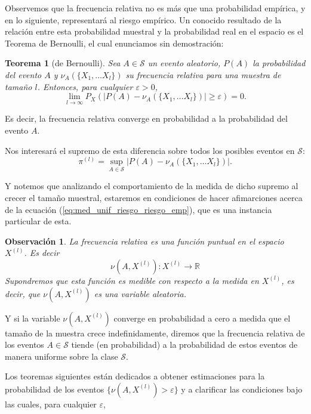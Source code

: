 \documentclass{article}
\newtheorem{thm}{Teorema}[subsection]
\newtheorem{obs}{Observación}[subsection]
\begin{document}
Observemos que la frecuencia relativa no es más que una probabilidad empírica, y en lo siguiente, representará al riesgo
empírico. Un conocido resultado de la relación entre esta probabilidad muestral y la probabilidad real en el espacio
es el Teorema de Bernoulli, el cual enunciamos sin demostración:

\begin{thm}[de Bernoulli]
Sea \( A \in \mathcal{S} \) un evento aleatorio, $P(A)$ la probabilidad del evento $A$ y $\nu_A(\{X_1,\dots X_l\})$ su frecuencia relativa para una muestra de
tamaño $l$. Entonces, para cualquier $\varepsilon > 0$,
\[
    \lim_{l\to\infty} P_X\left(| P(A)-\nu_A(\{X_1,\dots X_l\})| \geq \varepsilon\right) = 0.
\]
\end{thm}

Es decir, la frecuencia relativa converge en probabilidad a la probabilidad del evento $A$.\newline

Nos interesará el supremo de esta diferencia sobre todos los posibles eventos en $\mathcal{S}$:
\begin{equation}
    \pi^{(l)} = \sup_{A\in\mathcal{S}} |P(A)-\nu_A(\{X_1,\dots X_l\})|. \label{def: funcion pi}
\end{equation}

Y notemos que analizando el comportamiento de la medida de dicho supremo al crecer el tamaño muestral, 
estaremos en condiciones de hacer afimarciones acerca de la ecuación (\ref{eq:med_unif_riesgo_riesgo_emp}),
que es una instancia particular de esta.\newline

\begin{obs}
La frecuencia relativa es una función puntual en el espacio \( X^{(l)} \). Es decir
\[ \nu(A, X^{(l)}): X^{(l)} \rightarrow \mathbb{R}
\]
Supondremos que esta función es medible con respecto a la medida en \( X^{(l)} \), 
es decir, que \( \nu(A, X^{(l)}) \) es una variable aleatoria.
\end{obs} 

Y si la variable \( \nu(A, X^{(l)}) \) converge en probabilidad a cero a medida que 
el tamaño de la muestra crece indefinidamente, diremos que la frecuencia relativa 
de los eventos \( A \in \mathcal{S} \) tiende (en probabilidad) a la probabilidad 
de estos eventos de manera uniforme sobre la clase \( \mathcal{S} \).\newline

Los teoremas siguientes están dedicados a obtener estimaciones para la probabilidad 
de los eventos \( \{ \nu(A, X^{(l)}) > \varepsilon \} \) y a clarificar las condiciones 
bajo las cuales, para cualquier \( \varepsilon \),
\end{document}
